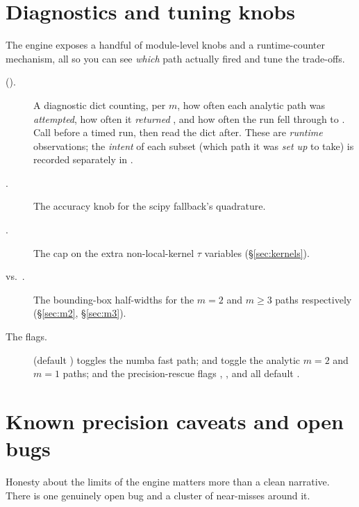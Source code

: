 \section{Diagnostics and tuning knobs}\label{sec:diagnostics}

The engine exposes a handful of module-level knobs and a runtime-counter
mechanism, all so you can see \emph{which} path actually fired and tune the
trade-offs.

\begin{description}
  \item[ ().] A diagnostic
        dict counting, per $m$, how often each analytic path was \emph{attempted},
        how often it \emph{returned }, and how often the run fell
        through to . Call 
        before a timed run, then read the dict after. These are \emph{runtime}
        observations; the \emph{intent} of each subset (which path it was
        \emph{set up} to take) is recorded separately in
        .
  \item[.] The accuracy knob for the scipy
        fallback's quadrature.
  \item[.] The cap on the extra non-local-kernel
        $\tau$ variables (\S\ref{sec:kernels}).
  \item[ vs.\ .]
        The bounding-box half-widths for the $m=2$ and $m\ge 3$ paths respectively
        (\S\ref{sec:m2}, \S\ref{sec:m3}).
  \item[The  flags.]  (default
        ) toggles the numba fast path; 
        and  toggle the analytic $m=2$ and $m=1$ paths;
        and the precision-rescue flags
        ,
        , and
         all default .
\end{description}

\section{Known precision caveats and open bugs}\label{sec:knownbugs}

Honesty about the limits of the engine matters more than a clean narrative. There
is one genuinely open bug and a cluster of near-misses around it.

